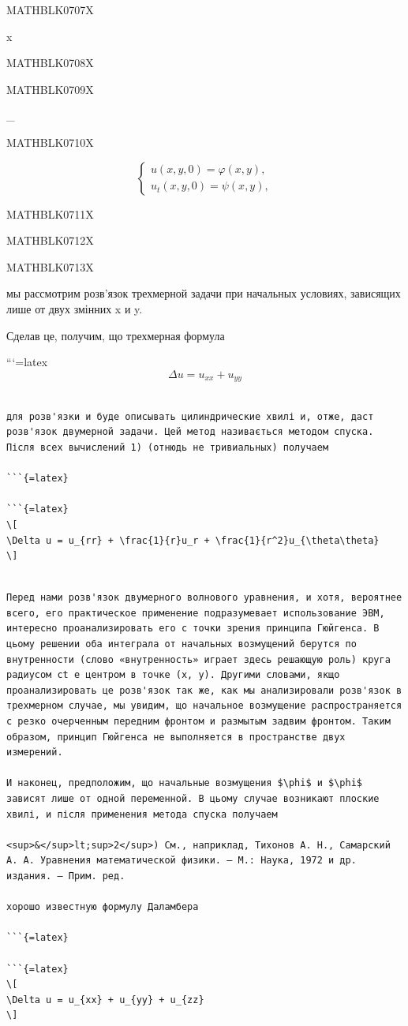 \documentclass[
]{article}
\begin{document}
MATHBLK0707X

x

MATHBLK0708X

MATHBLK0709X

\_ \textbar{}

MATHBLK0710X

\[
\begin{cases} u(x, y, 0) = \varphi(x, y), \\ u_t(x, y, 0) = \psi(x, y), \end{cases}
\]

MATHBLK0711X

MATHBLK0712X

MATHBLK0713X

мы рассмотрим розв'язок трехмерной задачи при начальных условиях,
зависящих лише от двух змінних x и y.

Сделав це, получим, що трехмерная формула

```{=latex}
\[
\Delta u = u_{xx} + u_{yy}
\]

\begin{verbatim}

для розв'язки и буде описывать цилиндрические хвилі и, отже, даст розв'язок двумерной задачи. Цей метод називається методом спуска. Після всех вычислений 1) (отнюдь не тривиальных) получаем

```{=latex}

```{=latex}
\[
\Delta u = u_{rr} + \frac{1}{r}u_r + \frac{1}{r^2}u_{\theta\theta}
\]
\end{verbatim}

\begin{verbatim}

Перед нами розв'язок двумерного волнового уравнения, и хотя, вероятнее всего, его практическое применение подразумевает использование ЭВМ, интересно проанализировать его с точки зрения принципа Гюйгенса. В цьому решении оба интеграла от начальных возмущений берутся по внутренности (слово «внутренность» играет здесь решающую роль) круга радиусом сt е центром в точке (x, y). Другими словами, якщо проанализировать це розв'язок так же, как мы анализировали розв'язок в трехмерном случае, мы увидим, що начальное возмущение распространяется с резко очерченным передним фронтом и размытым задвим фронтом. Таким образом, принцип Гюйгенса не выполняется в пространстве двух измерений.

И наконец, предположим, що начальные возмущения $\phi$ и $\phi$ зависят лише от одной переменной. В цьому случае возникают плоские хвилі, и після применения метода спуска получаем

<sup>&</sup>lt;sup>2</sup>) См., наприклад, Тихонов А. Н., Самарский А. А. Уравнения математической физики. — М.: Наука, 1972 и др. издания. — Прим. ред.

хорошо известную формулу Даламбера

```{=latex}

```{=latex}
\[
\Delta u = u_{xx} + u_{yy} + u_{zz}
\]
\end{verbatim}
\end{document}
